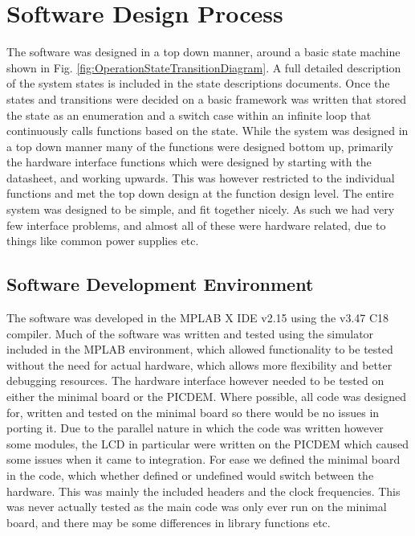 \documentclass[]{report}
\begin{document}
\section{Software Design Process}
The software was designed in a top down manner, around a basic state machine shown in Fig. \ref{fig:OperationStateTransitionDiagram}. A full detailed description of the system states is included in the state descriptions documents.
Once the states and transitions were decided on a basic framework was written that stored the state as an enumeration and a switch case within an infinite loop that continuously calls functions based on the state. \newline
While the system was designed in a top down manner many of the functions were designed bottom up, primarily the hardware interface functions which were designed by starting with the datasheet, and working upwards. This was however restricted to the individual functions and met the top down design at the function design level. \newline
The entire system was designed to be simple, and fit together nicely. As such we had very few interface problems, and almost all of these were hardware related, due to things like common power supplies etc.


\subsection{Software Development Environment}
The software was developed in the MPLAB X IDE v2.15 using the v3.47 C18 compiler. Much of the software was written and tested using the simulator included in the MPLAB environment, which allowed functionality to be tested without the need for actual hardware, which allows more flexibility and better debugging resources. The hardware interface however needed to be tested on either the minimal board or the PICDEM. Where possible, all code was designed for, written and tested on the minimal board so there would be no issues in porting it. Due to the parallel nature in which the code was written however some modules, the LCD in particular were written on the PICDEM which caused some issues when it came to integration. \newline
For ease we defined the minimal board in the code, which whether defined or undefined would switch between the hardware. This was mainly the included headers and the clock frequencies. This was never actually tested as the main code was only ever run on the minimal board, and there may be some differences in library functions etc.
\end{document}

